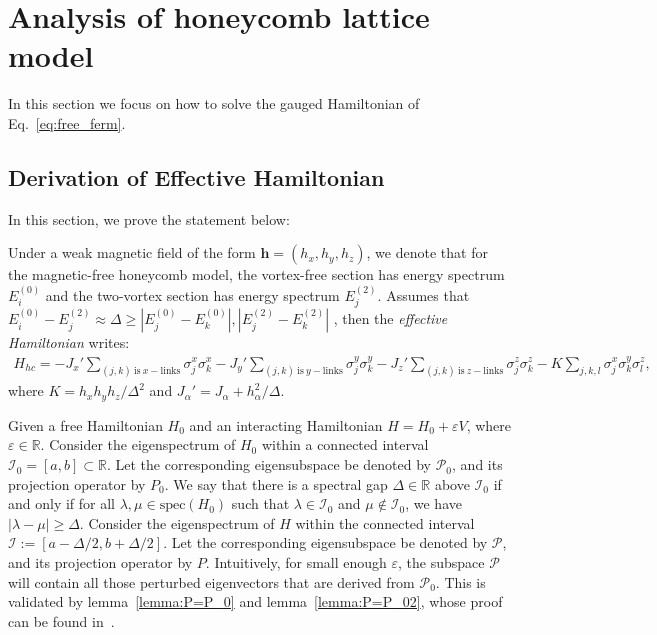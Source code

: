 \section{Analysis of honeycomb lattice model\label{app:ana}}

In this section we focus on how to solve the gauged Hamiltonian of Eq.~\eqref{eq:free_ferm}. 
\subsection{Derivation of Effective Hamiltonian}
In this section, we prove the statement below:
\begin{theorem}\label{theo:perturbed_honeycomb}
    Under a weak magnetic field of the form $\mathbf{h} = (h_x,h_y,h_z) $, we denote that for the magnetic-free honeycomb model, the vortex-free section has energy spectrum $E_i^{(0)}$ and the two-vortex section has energy spectrum $E_j^{(2)}$. Assumes that  $E_i^{(0)} - E_j^{(2)} \approx \Delta \geq |E^{(0)}_j - E^{(0)}_k|,|E^{(2)}_j - E^{(2)}_k|$ , then the \textit{effective Hamiltonian} writes:  
    \begin{align}H_{hc}=-J_x'\sum_{(j,k)\mathrm{~is~}x-\mathrm{links}}\sigma_j^x\sigma_k^x-J_y'\sum_{(j,k)\mathrm{~is~}y-\mathrm{links}}\sigma_j^y\sigma_k^y-J_z'\sum_{(j,k)\mathrm{~is~}z-\mathrm{links}}\sigma_j^z\sigma_k^z - K\sum_{j,k,l}\sigma_j^x \sigma_k^y \sigma_l^z,\end{align}
    where $K = {h_xh_yh_z}/{\Delta^2}$ and $J_{\alpha}' = J_{\alpha} + h_{\alpha}^2/\Delta$.
\end{theorem}
Given a free Hamiltonian $H_0$ and an interacting Hamiltonian $H = H_0 + \varepsilon V$, where $\varepsilon \in \mathbb{R}$.
Consider the eigenspectrum of $H_0$ within a connected interval $\mathcal{I}_0 = [a,b] \subset \mathbb{R}$. Let the corresponding eigensubspace be denoted by $\mathcal{P}_0$, and its projection operator by $P_0$.
We say that there is a spectral gap $\Delta \in \mathbb{R}$ above $\mathcal{I}_0$ if and only if for all $\lambda, \mu \in \text{spec}(H_0)$ such that $\lambda \in \mathcal{I}_0$ and $\mu \notin \mathcal{I}_0$, we have $|\lambda - \mu| \geq \Delta$.
Consider the eigenspectrum of $H$ within the connected interval $\mathcal{I} := [a-\Delta/2, b+\Delta/2]$. Let the corresponding eigensubspace be denoted by $\mathcal{P}$, and its projection operator by $P$.
Intuitively, for small enough $\varepsilon$, the subspace $\mathcal{P}$ will contain all those perturbed eigenvectors that are derived from $\mathcal{P}_0$. This is validated by lemma~\ref{lemma:P=P_0} and lemma~\ref{lemma:P=P_02}, whose proof can be found in~\cite{bravyi2011schrieffer}.

